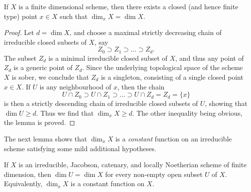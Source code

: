 \begin{lemma}
\label{lemma-dimension-achieved-by-finite-type-point}
If $X$ is a finite dimensional scheme,
then there exists a closed (and hence finite type) point $x \in X$
such that $\dim_x X = \dim X$.
\end{lemma}

\begin{proof}
Let $d = \dim X$,
and choose a maximal strictly decreasing
chain of irreducible closed subsets of $X$,
say
\begin{equation}
\label{equation-maximal-chain}
Z_0 \supset Z_1 \supset \ldots \supset Z_d.
\end{equation}
The subset $Z_d$ is a minimal irreducible closed subset of $X$,
and thus any point of $Z_d$ is a generic point of $Z_d$.
Since the underlying topological space of the scheme $X$ is sober,
we conclude that $Z_d$ is a singleton, consisting of a single
closed point $x \in X$.
If $U$ is
any neighbourhood of $x$, then
the chain
$$
U\cap Z_0 \supset U\cap Z_1 \supset \ldots \supset U\cap Z_d = Z_d =
\{x\}
$$
is then a strictly descending chain of irreducible
closed subsets of $U$, showing that $\dim U \geq d$.
Thus we find that $\dim_x X \geq d$.  The other inequality
being obvious, the lemma is proved.
\end{proof}

\noindent
The next lemma shows that $\dim_x X$ is a {\it constant} function
on an irreducible scheme satisfying some mild additional hypotheses.

\begin{lemma}
\label{lemma-constancy-of-dimension}
If $X$ is an irreducible, Jacobson, catenary, and locally Noetherian
scheme of finite dimension,
then $\dim U = \dim X$ for every
non-empty open subset $U$ of $X$.
Equivalently, $\dim_x X$ is a constant function on $X$.
\end{lemma}

